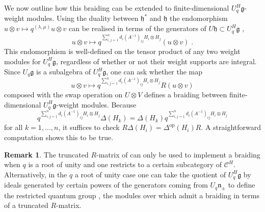 \documentclass[12pt,dvipsnames]{article}
\numberwithin{equation}{section}
\theoremstyle{definition}
\newtheorem{remark}[definition]{Remark}
\newcommand{\cat}[1]{\mathcal{#1}}
\newcommand{\1}{\ensuremath{\mathbbm{1}}}
\begin{document}
We now outline how this braiding can be extended to finite-dimensional $U_q^H\mathfrak{g}$-weight modules. Using the duality between $\mathfrak{h}^\ast$ and $\mathfrak{h}$ the endomorphism $u\otimes v \mapsto q^{(\lambda,\mu)} u\otimes v$ can be realised in terms of the generators of $U\mathfrak{h}\subset U_q^H\mathfrak{g}$ \cite[Lem.\,40]{GP10},
\begin{equation}\label{eq:UqHg automorphism}
    u\otimes v \mapsto q^{\sum_{i,j=1}^nd_i(A^{-1})_{ij}H_i\otimes H_j}(u\otimes v) \;.
\end{equation}
This endomorphism is well-defined on the tensor product of any two weight modules for $U_q^H\mathfrak{g}$, regardless of whether or not their weight supports are integral. Since $U_q\mathfrak{g}$ is a subalgebra of $U_q^H\mathfrak{g}$, one can ask whether the map
\begin{equation}
    u\otimes v \mapsto q^{\sum_{i,j=1}^nd_i(A^{-1})_{ij}H_i\otimes H_j}R(u\otimes v)
\end{equation}
composed with the swap operation on $U\otimes V$ defines a braiding between finite-dimensional $U_q^H\mathfrak{g}$-weight modules. Because
\begin{equation}
    q^{\sum_{i,j=1}^nd_i(A^{-1})_{ij}H_i\otimes H_j}\Delta(H_k) = \Delta(H_k)q^{\sum_{i,j=1}^nd_i(A^{-1})_{ij}H_i\otimes H_j}
\end{equation}
for all $k = 1,\dots,n$, it suffices to check $R\Delta(H_i) = \Delta^\mathrm{op}(H_i)R$. A straightforward computation shows this to be true.
\begin{remark}
    The truncated $R$-matrix of \cite{GP10} can only be used to implement a braiding when $q$ is a root of unity and one restricts to a certain subcategory of $\cat{C}^H$. Alternatively, in the $q$ a root of unity case one can take the quotient of $U_q^H\mathfrak{g}$ by ideals generated by certain powers of the generators coming from $U_q\mathfrak{n}_\pm$ to define the restricted quantum group \cite{GPT07,CGP14,Ru19}, the modules over which admit a braiding in terms of a truncated $R$-matrix. 
\end{remark}
\end{document}
